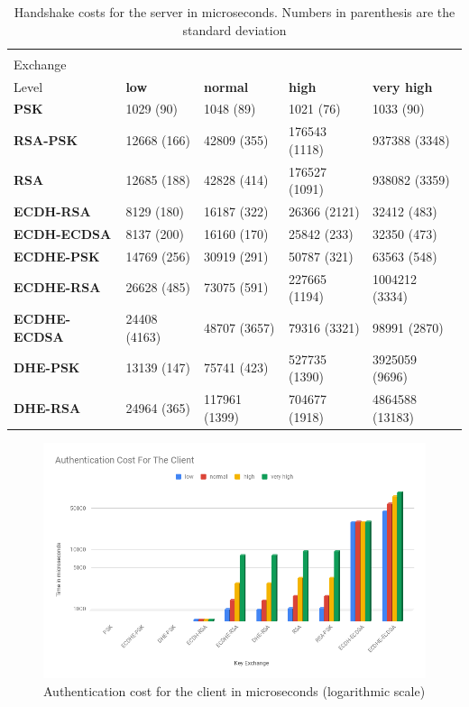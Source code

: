 				\begin{table}[]
				  \begin{tabular}{|l|l|l|l|l|}
				  \hline
				   \backslashbox{Key\\Exchange}{Security\\Level}                    & \textbf{low} & \textbf{normal} & \textbf{high} & \textbf{very high} \\ \hline
				  \textbf{PSK}         & 1029 (90)     & 1048 (89)        & 1021 (76)      & 1033 (90)           \\ \hline
				  \textbf{RSA-PSK}     & 12668 (166)   & 42809 (355)      & 176543 (1118)  & 937388 (3348)       \\ \hline
				  \textbf{RSA}         & 12685 (188)   & 42828 (414)      & 176527 (1091)  & 938082 (3359)       \\ \hline
				  \textbf{ECDH-RSA}    & 8129 (180)    & 16187 (322)      & 26366 (2121)   & 32412 (483)         \\ \hline
				  \textbf{ECDH-ECDSA}  & 8137 (200)    & 16160 (170)      & 25842 (233)    & 32350 (473)         \\ \hline
				  \textbf{ECDHE-PSK}   & 14769 (256)   & 30919 (291)      & 50787 (321)    & 63563 (548)         \\ \hline
				  \textbf{ECDHE-RSA}   & 26628 (485)   & 73075 (591)      & 227665 (1194)  & 1004212 (3334)      \\ \hline
				  \textbf{ECDHE-ECDSA} & 24408 (4163)  & 48707 (3657)     & 79316 (3321)   & 98991 (2870)        \\ \hline
				  \textbf{DHE-PSK}     & 13139 (147)   & 75741 (423)      & 527735 (1390)  & 3925059 (9696)      \\ \hline
				  \textbf{DHE-RSA}     & 24964 (365)   & 117961 (1399)    & 704677 (1918)  & 4864588 (13183)     \\ \hline
				  \end{tabular}
				  \caption{Handshake costs for the server in microseconds. Numbers in parenthesis are the standard deviation}
				  \label{table:server-hs-costs-papi}
				  \end{table}
  
				  \begin{figure}
					\centering
					\includegraphics[width=1.0\textwidth]{img/papi-client-auth-cost.png}
					\centering \caption{Authentication cost for the client in microseconds (logarithmic scale)}
					\label{af:1}
				  \end{figure}
  
